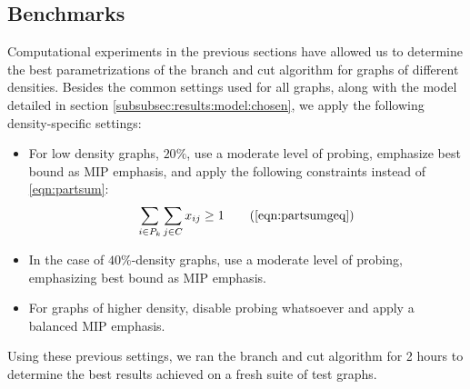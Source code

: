 
\subsection{Benchmarks}
\label{subsec:resultsbenchs}

Computational experiments in the previous sections have allowed us to determine the best parametrizations of the branch and cut algorithm for graphs of different densities. Besides the common settings used for all graphs, along with the model detailed in section \ref{subsubsec:results:model:chosen}, we apply the following density-specific settings:

\begin{itemize}

\item{For low density graphs, $20\%$, use a moderate level of probing, emphasize best bound as MIP emphasis, and apply the following constraints instead of \ref{eqn:partsum}:
\[
\sum_{i \in P_k} \sum_{j \in C} x_{ij} \geq 1 \tag{\ref{eqn:partsumgeq}}
\]}

\item{In the case of $40\%$-density graphs, use a moderate level of probing, emphasizing best bound as MIP emphasis.}

\item{For graphs of higher density, disable probing whatsoever and apply a balanced MIP emphasis.}

\end{itemize}

Using these previous settings, we ran the branch and cut algorithm for 2 hours to determine the best results achieved on a fresh suite of test graphs.

